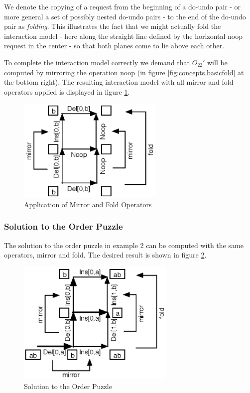 We denote the copying of a request from the beginning of a do-undo pair - or more general a set of possibly nested do-undo pairs - to the end of the do-undo pair as \emph{folding}. This illustrates the fact that we might actually fold the interaction model - here along the straight line defined by the horizontal noop request in the center - so that both planes come to lie above each other. 

To complete the interaction model correctly we demand that $O_{22}'$ will be computed by mirroring the operation noop (in figure \ref{fig:concepts.basicfold} at the bottom right). The resulting interaction model with all mirror and fold operators applied is displayed in figure \ref{fig:concepts.basicfold-solution}.

\begin{figure}[htb]
 \centering
 \includegraphics[width=6.99cm,height=4.97cm]{../../images/concepts_basicfold-solution.eps}
 \caption{Application of Mirror and Fold Operators}
 \label{fig:concepts.basicfold-solution}
\end{figure}


\subsubsection{Solution to the Order Puzzle}
The solution to the order puzzle in example 2 can be computed with the same operators, mirror and fold. The desired result is shown in figure \ref{fig:concepts.orderpuzzle}.

\begin{figure}[htb]
 \centering
 \includegraphics[width=7.55cm,height=5.96cm]{../../images/concepts_orderpuzzle.eps}
 \caption{Solution to the Order Puzzle}
 \label{fig:concepts.orderpuzzle}
\end{figure}


